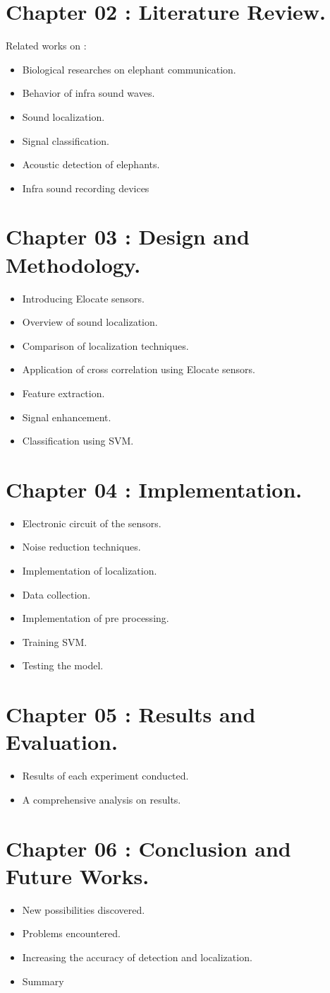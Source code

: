 \documentclass[11pt]{article}
\numberwithin{figure}{section}
\numberwithin{table}{section}
\begin{document}
\section*{Chapter 02 : Literature Review.}
Related works on :
\begin{itemize}
  \item Biological researches on elephant communication. 
  \item Behavior of infra sound waves.
  \item Sound localization.
  \item Signal classification.
  \item Acoustic detection of elephants.
  \item Infra sound recording devices
\end{itemize}
\section*{Chapter 03 : Design and Methodology.}
\begin{itemize}
  \item Introducing Elocate sensors.
  \item Overview of sound localization. 
  \item Comparison of localization techniques.
  \item Application of cross correlation using Elocate sensors.
  \item Feature extraction.
  \item Signal enhancement.
  \item Classification using SVM.
\end{itemize}
\section*{Chapter 04 : Implementation.}
\begin{itemize}
  \item Electronic circuit of the sensors.
  \item Noise reduction techniques.
  \item Implementation of localization.
  \item Data collection.
  \item Implementation of pre processing.
  \item Training SVM.
  \item Testing the model.
\end{itemize}
\section*{Chapter 05 : Results and Evaluation.}
\begin{itemize}
  \item Results of each experiment conducted.
  \item A comprehensive analysis on results.
\end{itemize}
\section*{Chapter 06 : Conclusion and Future Works.}
\begin{itemize}
  \item New possibilities discovered.
  \item Problems encountered.
  \item Increasing the accuracy of detection and localization.
  \item Summary
\end{itemize}
\newpage

\end{document}
